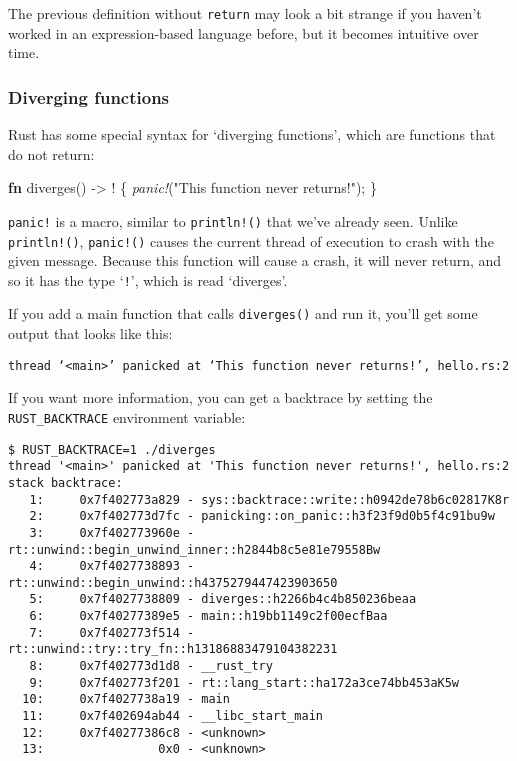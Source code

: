 \documentclass[a4paper,]{book}
\newenvironment{Shaded}{\begin{snugshade}}{\end{snugshade}}
\newcommand{\KeywordTok}[1]{\textcolor[rgb]{0.13,0.29,0.53}{\textbf{{#1}}}}
\newcommand{\StringTok}[1]{\textcolor[rgb]{0.31,0.60,0.02}{{#1}}}
\newcommand{\PreprocessorTok}[1]{\textcolor[rgb]{0.56,0.35,0.01}{\textit{{#1}}}}
\newcommand{\NormalTok}[1]{{#1}}
\begin{document}
The previous definition without \texttt{return} may look a bit strange
if you haven't worked in an expression-based language before, but it
becomes intuitive over time.

\subsubsection{Diverging functions}\label{diverging-functions}

Rust has some special syntax for `diverging functions', which are
functions that do not return:

\begin{Shaded}
\begin{Highlighting}[]
\KeywordTok{fn} \NormalTok{diverges() -> ! \{}
    \PreprocessorTok{panic!}\NormalTok{(}\StringTok{"This function never returns!"}\NormalTok{);}
\NormalTok{\}}
\end{Highlighting}
\end{Shaded}

\texttt{panic!} is a macro, similar to \texttt{println!()} that we've
already seen. Unlike \texttt{println!()}, \texttt{panic!()} causes the
current thread of execution to crash with the given message. Because
this function will cause a crash, it will never return, and so it has
the type `\texttt{!}', which is read `diverges'.

If you add a main function that calls \texttt{diverges()} and run it,
you'll get some output that looks like this:

\begin{verbatim}
thread ‘<main>’ panicked at ‘This function never returns!’, hello.rs:2
\end{verbatim}

If you want more information, you can get a backtrace by setting the
\texttt{RUST\_BACKTRACE} environment variable:

\begin{verbatim}
$ RUST_BACKTRACE=1 ./diverges
thread '<main>' panicked at 'This function never returns!', hello.rs:2
stack backtrace:
   1:     0x7f402773a829 - sys::backtrace::write::h0942de78b6c02817K8r
   2:     0x7f402773d7fc - panicking::on_panic::h3f23f9d0b5f4c91bu9w
   3:     0x7f402773960e - rt::unwind::begin_unwind_inner::h2844b8c5e81e79558Bw
   4:     0x7f4027738893 - rt::unwind::begin_unwind::h4375279447423903650
   5:     0x7f4027738809 - diverges::h2266b4c4b850236beaa
   6:     0x7f40277389e5 - main::h19bb1149c2f00ecfBaa
   7:     0x7f402773f514 - rt::unwind::try::try_fn::h13186883479104382231
   8:     0x7f402773d1d8 - __rust_try
   9:     0x7f402773f201 - rt::lang_start::ha172a3ce74bb453aK5w
  10:     0x7f4027738a19 - main
  11:     0x7f402694ab44 - __libc_start_main
  12:     0x7f40277386c8 - <unknown>
  13:                0x0 - <unknown>
\end{verbatim}
\end{document}
